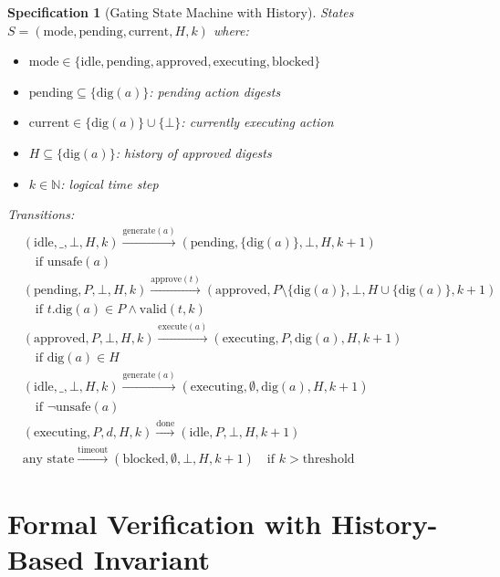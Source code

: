 \documentclass[12pt]{article}
\newtheorem{spec}{Specification}[section]
\begin{document}
\begin{spec}[Gating State Machine with History]
States $S = (\text{mode}, \text{pending}, \text{current}, H, k)$ where:
\begin{itemize}
    \item $\text{mode} \in \{\text{idle}, \text{pending}, \text{approved}, \text{executing}, \text{blocked}\}$
    \item $\text{pending} \subseteq \{\mathrm{dig}(a)\}$: pending action digests
    \item $\text{current} \in \{\mathrm{dig}(a)\} \cup \{\bot\}$: currently executing action
    \item $H \subseteq \{\mathrm{dig}(a)\}$: history of approved digests
    \item $k \in \mathbb{N}$: logical time step
\end{itemize}

Transitions:
\begin{align*}
& (\text{idle}, \_, \bot, H, k) \xrightarrow{\text{generate}(a)} (\text{pending}, \{\mathrm{dig}(a)\}, \bot, H, k+1) \\
& \quad \text{if } \text{unsafe}(a) \\
& (\text{pending}, P, \bot, H, k) \xrightarrow{\text{approve}(t)} (\text{approved}, P\setminus\{\mathrm{dig}(a)\}, \bot, H\cup\{\mathrm{dig}(a)\}, k+1) \\
& \quad \text{if } t.\mathrm{dig}(a) \in P \land \text{valid}(t,k) \\
& (\text{approved}, P, \bot, H, k) \xrightarrow{\text{execute}(a)} (\text{executing}, P, \mathrm{dig}(a), H, k+1) \\
& \quad \text{if } \mathrm{dig}(a) \in H \\
& (\text{idle}, \_, \bot, H, k) \xrightarrow{\text{generate}(a)} (\text{executing}, \emptyset, \mathrm{dig}(a), H, k+1) \\
& \quad \text{if } \neg\text{unsafe}(a) \\
& (\text{executing}, P, d, H, k) \xrightarrow{\text{done}} (\text{idle}, P, \bot, H, k+1) \\
& \text{any state} \xrightarrow{\text{timeout}} (\text{blocked}, \emptyset, \bot, H, k+1) \quad \text{if } k > \text{threshold}
\end{align*}
\end{spec}

\section{Formal Verification with History-Based Invariant}
\end{document}
